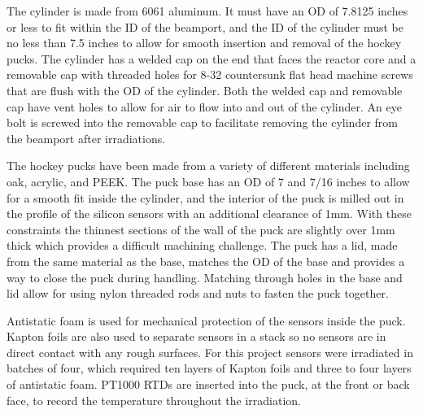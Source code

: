 The cylinder is made from 6061 aluminum. 
It must have an OD of 7.8125 inches or less to fit within the ID of the beamport, and the ID of the cylinder must be no less than 7.5 inches to allow for smooth insertion and removal of the hockey pucks.
The cylinder has a welded cap on the end that faces the reactor core and a removable cap with threaded holes for 8-32 countersunk flat head machine screws that are flush with the OD of the cylinder. 
Both the welded cap and removable cap have vent holes to allow for air to flow into and out of the cylinder.
An eye bolt is screwed into the removable cap to facilitate removing the cylinder from the beamport after irradiations.

The hockey pucks have been made from a variety of different materials including oak, acrylic, and PEEK. 
The puck base has an OD of 7 and 7/16 inches to allow for a smooth fit inside the cylinder, and the interior of the puck is milled out in the profile of the silicon sensors with an additional clearance of 1mm. 
With these constraints the thinnest sections of the wall of the puck are slightly over 1mm thick which provides a difficult machining challenge.
The puck has a lid, made from the same material as the base, matches the OD of the base and provides a way to close the puck during handling.
Matching through holes in the base and lid allow for using nylon threaded rods and nuts to fasten the puck together. 

Antistatic foam is used for mechanical protection of the sensors inside the puck.
Kapton foils are also used to separate sensors in a stack so no sensors are in direct contact with any rough surfaces.
For this project sensors were irradiated in batches of four, which required ten layers of Kapton foils and three to four layers of antistatic foam. 
PT1000 RTDs are inserted into the puck, at the front or back face, to record the temperature throughout the irradiation.

